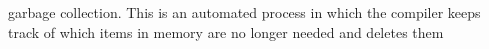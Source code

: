garbage collection. 
This is an automated process in which the compiler keeps track
of which items in memory are no longer needed and deletes them
